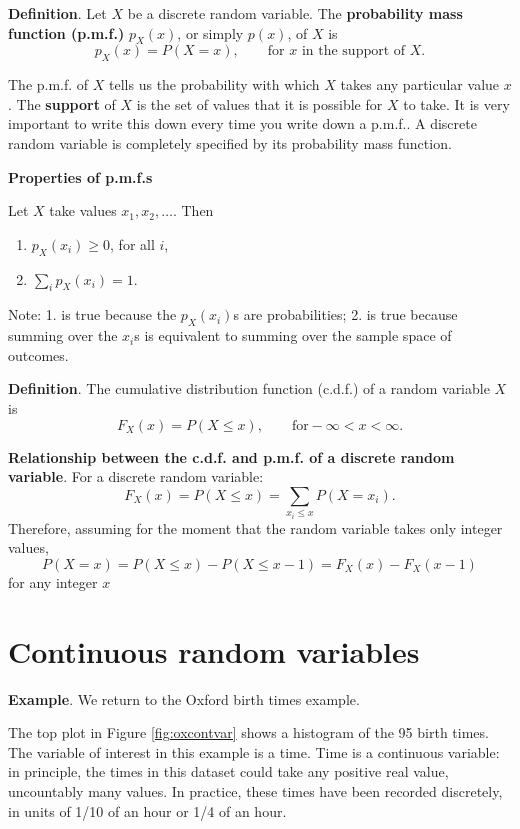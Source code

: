 \documentclass[
  11pt,
  british,
  openany, a4paper]{book}
\providecommand{\tightlist}{%
  \setlength{\itemsep}{0pt}\setlength{\parskip}{0pt}}
\begin{document}
\textbf{Definition}. Let \(X\) be a discrete random variable. The \textbf{probability mass function (p.m.f.)} \(p_X(x)\), or simply \(p(x)\), of \(X\) is
\[ p_X(x) = P(X=x), \qquad \mbox{for $x$ in the support of $X$}.  \]

The p.m.f. of \(X\) tells us the probability with which \(X\) takes any particular value \(x\). The \textbf{support} of \(X\) is the set of values that it is possible for \(X\) to take. It is very important to write this down every time you write down a p.m.f.. A discrete random variable is completely specified by its probability mass function.

\textbf{Properties of p.m.f.s}

Let \(X\) take values \(x_1, x_2,\ldots.\) Then

\begin{enumerate}
\def\labelenumi{\arabic{enumi}.}
\tightlist
\item
  \(p_X(x_i) \geq 0\), for all \(i\),
\item
  \(\displaystyle\sum_i p_X(x_i) = 1\).
\end{enumerate}

Note: 1. is true because the \(p_X(x_i)\)s are probabilities; 2. is true because summing over the \(x_i\)s is equivalent to summing over the sample space of outcomes.

\textbf{Definition}. The cumulative distribution function (c.d.f.) of a random variable \(X\) is
\[ F_X(x) = P(X \leq x), \qquad \mbox{for} -\infty < x < \infty. \]

\textbf{Relationship between the c.d.f. and p.m.f. of a discrete random variable}. For a discrete random variable:
\[ F_X(x) = P(X \leq x) = \sum_{x_i \leq x} P(X = x_i). \]
Therefore, assuming for the moment that the random variable takes only integer values,
\[ P(X=x) = P(X \leq x) - P(X \leq x-1) = F_X(x) - F_X(x-1) \]
for any integer \(x\)

\hypertarget{continuous}{%
\section{Continuous random variables}\label{continuous}}

\textbf{Example}. We return to the Oxford birth times example.

The top plot in Figure \ref{fig:oxcontvar} shows a histogram of the 95 birth times. The variable of interest in this example is a time. Time is a continuous variable: in principle, the times in this dataset could take any positive real value, uncountably many values. In practice, these times have been recorded discretely, in units of 1/10 of an hour or 1/4 of an hour.
\end{document}
